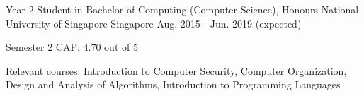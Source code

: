 

\begin{cventries}

	\cventry
	{Year 2 Student in Bachelor of Computing (Computer Science), Honours} %
	{National University of Singapore} %
	{Singapore} %
	{Aug. 2015 - Jun. 2019 (expected)} %
	{
		\begin{cvitems} %
		\item {Semester 2 CAP: 4.70 out of 5}
		\item {Relevant courses: Introduction to Computer Security, Computer Organization, Design and Analysis of Algorithms, Introduction to Programming Languages}
		\end{cvitems}
	}

\end{cventries}
